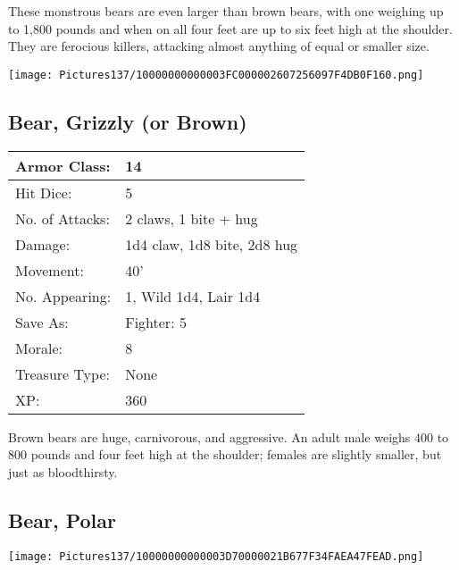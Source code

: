 \documentclass[a4paper,twoside,openany,10pt]{book}
\begin{document}
\begin{multicols}{2}
These monstrous bears are even larger than brown bears, with one weighing up to 1,800 pounds and when on all four feet are up to six feet high at the shoulder. They are ferocious killers, attacking almost anything of equal or smaller size.

\begin{center}
	\texttt{[image: Pictures137/10000000000003FC000002607256097F4DB0F160.png]}
\end{center}

\subsection*{Bear, Grizzly (or Brown)}\label{bear-grizzly-or-brown}

\begin{tabularx}{0.48\textwidth}{@{}lX@{}}
Armor Class: & 14 \\\hline
Hit Dice: & 5 \\\hline
No. of Attacks: & 2 claws, 1 bite + hug \\\hline
Damage: & 1d4 claw, 1d8 bite, 2d8 hug \\\hline
Movement: & 40' \\\hline
No. Appearing: & 1, Wild 1d4, Lair 1d4 \\\hline
Save As: & Fighter: 5 \\\hline
Morale: & 8 \\\hline
Treasure Type: & None \\\hline
XP: & 360 \\\hline
\end{tabularx}

Brown bears are huge, carnivorous, and aggressive. An adult male weighs 400 to 800 pounds and four feet high at the shoulder; females are slightly smaller, but just as bloodthirsty.

\subsection*{Bear, Polar}\label{bear-polar}


\begin{center}
	\texttt{[image: Pictures137/10000000000003D70000021B677F34FAEA47FEAD.png]}
\end{center}


\end{multicols}
\end{document}
